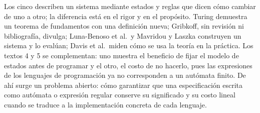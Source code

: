 Los cinco describen un sistema mediante estados y reglas que dicen cómo cambiar de uno a otro; la diferencia está en el rigor y en el propósito. Turing demuestra un teorema de fundamentos con una definición nueva; Gribkoff, sin revisión ni bibliografía, divulga; Luna-Benoso et al.~y Mavridou y Laszka construyen un sistema y lo evalúan; Davis et al.~miden cómo se usa la teoría en la práctica. Los textos 4 y 5 se complementan: uno muestra el beneficio de fijar el modelo de estados antes de programar y el otro, el costo de no hacerlo, pues las expresiones de los lenguajes de programación ya no corresponden a un autómata finito. De ahí surge un problema abierto: cómo garantizar que una especificación escrita como autómata o expresión regular conserve su significado y su costo lineal cuando se traduce a la implementación concreta de cada lenguaje.
